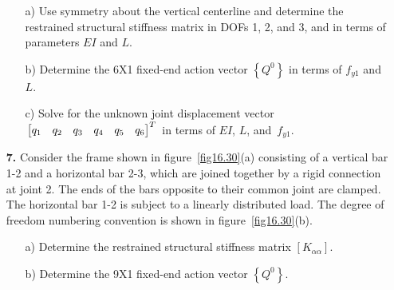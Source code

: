 \documentclass{AeroStructure-ERJohnson}
\begin{document}
\begin{exercise}
\begin{enumerate}[\textbf{2.}]
\begin{enumerate}[b)]
\item[{\hskip13pt}a)] Use symmetry about the vertical centerline and determine the restrained structural stiffness matrix in\break\hspace*{35pt} DOFs 1, 2, and 3, and in terms of parameters $E I$ and $L$.
\item[{\hskip13pt}b)] Determine the 6X1 fixed-end action vector $\left\{Q^{0}\right\}$ in terms of $f_{y 1}$ and $L$.
\item[{\hskip13pt}c)] Solve for the unknown joint displacement vector $\left[\begin{array}{@{}llllll@{}}q_{1} & q_{2} & q_{3} & q_{4} & q_{5} & q_{6}\end{array}\right]^{T}$ in terms of $E I$, $L$, and~$f_{y 1}$.
\end{enumerate}

\item[\textbf{7.}] Consider the frame shown in figure~\ref{fig16.30}(a) consisting of a vertical bar 1-2 and a horizontal bar 2-3, which are joined together by a rigid connection at joint 2. The ends of the bars opposite to their common joint are clamped. The horizontal bar 1-2 is subject to a linearly distributed load. The degree of freedom numbering convention is shown in figure~\ref{fig16.30}(b).

\vspace*{-8pt}


\vspace*{-1pc}

\begin{enumerate}[b)]
\item[{\hskip13pt}a)] Determine the restrained structural stiffness matrix $\left[K_{\alpha \alpha}\right]$.
\item[{\hskip13pt}b)] Determine the 9X1 fixed-end action vector $\left\{Q^{0}\right\}$.
\end{enumerate}


\end{enumerate}
\end{exercise}
\end{document}
